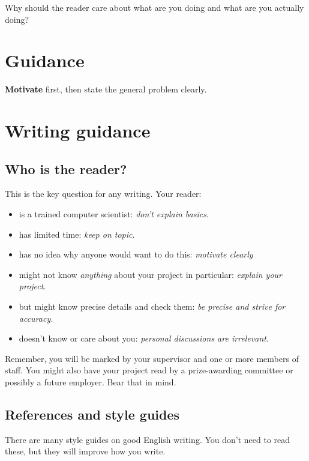 \documentclass{l4proj}
\begin{document}

Why should the reader care about what are you doing and what are you actually doing?
\section{Guidance}

\textbf{Motivate} first, then state the general problem clearly. 

\section{Writing guidance}
\subsection{Who is the reader?}

This is the key question for any writing. Your reader:

\begin{itemize}
    \item
    is a trained computer scientist: \emph{don't explain basics}.
    \item
    has limited time: \emph{keep on topic}.
    \item
    has no idea why anyone would want to do this: \emph{motivate clearly}
    \item
    might not know \emph{anything} about your project in particular:
    \emph{explain your project}.
    \item
    but might know precise details and check them: \emph{be precise and
    strive for accuracy.}
    \item
    doesn't know or care about you: \emph{personal discussions are
    irrelevant}.
\end{itemize}

Remember, you will be marked by your supervisor and one or more members
of staff. You might also have your project read by a prize-awarding
committee or possibly a future employer. Bear that in mind.

\subsection{References and style guides}
There are many style guides on good English writing. You don't need to
read these, but they will improve how you write.
\end{document}
